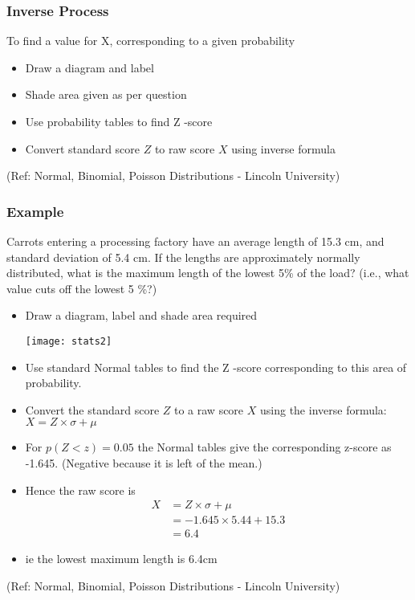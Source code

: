 \begin{frame}
\frametitle{Inverse Process}
To find a value for X, corresponding to a given probability
\begin{itemize}
\item Draw a diagram and label
\item Shade area given as per question
\item Use probability tables to find Z -score
\item Convert standard score $Z$ to raw score $X$ using inverse formula
\end{itemize}


{\tiny (Ref: Normal, Binomial, Poisson Distributions -  Lincoln University)}
\end{frame}

\begin{frame}
\frametitle{Example}
Carrots entering a processing factory have an average length of 15.3 cm, and
standard deviation of 5.4 cm. If the lengths are approximately normally distributed,
what is the maximum length of the lowest 5\% of the load?
(i.e., what value cuts off the lowest 5 \%?)
\begin{itemize}
\item Draw a diagram, label and shade area required

\begin{center}
\texttt{[image: stats2]}
\end{center}

\item Use standard Normal tables to find the Z -score corresponding to this area of probability. 
\item Convert the standard score $Z$ to a raw score $X$ using the inverse formula: $X = Z \times \sigma + \mu$
\item For $p(Z < z) = 0.05$ the Normal tables give the corresponding z-score as -1.645.
(Negative because it is left of the mean.)
\item Hence the raw score is 
\begin{align*}
X &= Z \times \sigma + \mu\\
&= -1.645 \times 5.44 + 15.3\\
&=6.4
\end{align*}
\item ie the lowest maximum length is 6.4cm
\end{itemize}


{\tiny (Ref: Normal, Binomial, Poisson Distributions -  Lincoln University)}
\end{frame}

